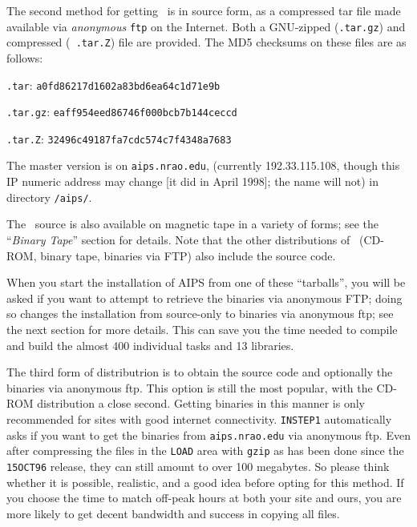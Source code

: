 \medskip{}

The second method for getting \AIPS\ is in source form, as a compressed
tar file made available via {\it anonymous\/} {\tt ftp} on the Internet.
Both a GNU-zipped ({\tt \THISVER .tar.gz}) and compressed ({\tt \THISVER
.tar.Z}) file are provided.  The MD5 checksums on these files are as
follows:
\medskip
{\parindent=2in
\item{\tt \THISVER .tar}: {\tt a0fd86217d1602a83bd6ea64c1d71e9b}
\item{\tt \THISVER .tar.gz}: {\tt eaff954eed86746f000bcb7b144ceccd}
\item{\tt \THISVER .tar.Z}: {\tt 32496c49187fa7cdc574c7f4348a7683}
}
\medskip

The master version is on {\tt aips.nrao.edu}, (currently 192.33.115.108,
though this IP numeric address may change [it did in April 1998]; the
name will not) in directory {\tt /aips/\THISVER}.

The \AIPS\ source is also available on magnetic tape in a variety of
forms; see the ``{\it Binary Tape\/}'' section for details.  Note that
the other distributions of \AIPS\ (CD-ROM, binary tape, binaries via
FTP) also include the source code.

When you start the installation of AIPS from one of these ``tarballs'',
you will be asked if you want to attempt to retrieve the binaries via
anonymous FTP; doing so changes the installation from source-only to
binaries via anonymous ftp; see the next section for more details.  This
can save you the time needed to compile and build the almost 400
individual tasks and 13 libraries.

\medskip{}

The third form of distributrion is to obtain the source code and
optionally the binaries via anonymous ftp.  This option is still the most
popular, with  the CD-ROM distribution a close second.
Getting binaries in this manner is only recommended for sites with good
internet connectivity.  {\tt INSTEP1} automatically asks if you want to
get the binaries from {\tt aips.nrao.edu} via anonymous ftp.  Even after
compressing the files in the {\tt LOAD} area with {\tt gzip} as has been
done since the {\tt 15OCT96} release, they can still amount to over 100
megabytes.  So please think whether it is possible, realistic, and a good
idea before opting for this method.  If you choose the time to match
off-peak hours at both your site and ours, you are more likely to get
decent bandwidth and success in copying all files.

